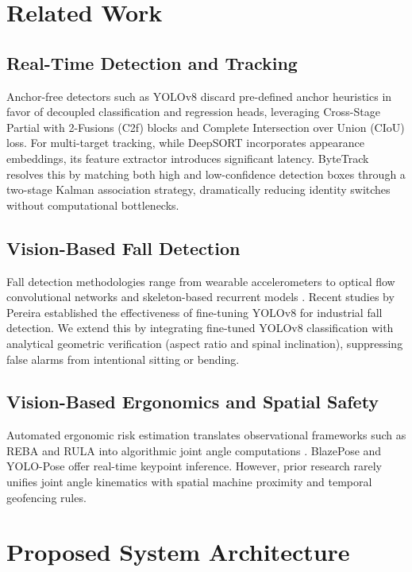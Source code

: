\documentclass[conference]{IEEEtran}
\begin{document}
\section{Related Work}
\subsection{Real-Time Detection and Tracking}
Anchor-free detectors such as YOLOv8 \cite{yolov8} discard pre-defined anchor heuristics in favor of decoupled classification and regression heads, leveraging Cross-Stage Partial with 2-Fusions (C2f) blocks and Complete Intersection over Union (CIoU) loss. For multi-target tracking, while DeepSORT \cite{deepsort} incorporates appearance embeddings, its feature extractor introduces significant latency. ByteTrack \cite{bytetrack} resolves this by matching both high and low-confidence detection boxes through a two-stage Kalman association strategy, dramatically reducing identity switches without computational bottlenecks.

\subsection{Vision-Based Fall Detection}
Fall detection methodologies range from wearable accelerometers \cite{bagala2012} to optical flow convolutional networks \cite{nunez2017} and skeleton-based recurrent models \cite{lima2021}. Recent studies by Pereira \cite{pereira2024} established the effectiveness of fine-tuning YOLOv8 for industrial fall detection. We extend this by integrating fine-tuned YOLOv8 classification with analytical geometric verification (aspect ratio and spinal inclination), suppressing false alarms from intentional sitting or bending.

\subsection{Vision-Based Ergonomics and Spatial Safety}
Automated ergonomic risk estimation translates observational frameworks such as REBA and RULA into algorithmic joint angle computations \cite{reba, nath2021}. BlazePose \cite{blazepose} and YOLO-Pose \cite{yolopose} offer real-time keypoint inference. However, prior research rarely unifies joint angle kinematics with spatial machine proximity and temporal geofencing rules.

\section{Proposed System Architecture}
\end{document}
